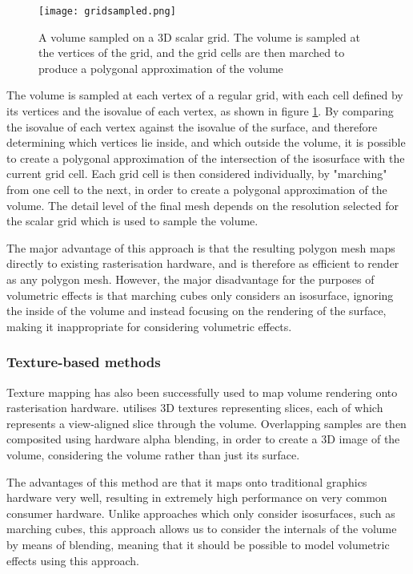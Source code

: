\begin{figure}
\centering
	\texttt{[image: gridsampled.png]}
	\caption{A volume sampled on a 3D scalar grid. The volume is sampled at the vertices of the grid, and the grid cells are then marched to produce a polygonal approximation of the volume}
	\label{fig:scalar_field_approximation}
\end{figure}

The volume is sampled at each vertex of a regular grid, with each cell defined by its vertices and the isovalue of each vertex, as shown in figure \ref{fig:scalar_field_approximation}. By comparing the isovalue of each vertex against the isovalue of the surface, and therefore determining which vertices lie inside, and which outside the volume, it is possible to create a polygonal approximation of the intersection of the isosurface with the current grid cell. Each grid cell is then considered individually, by "marching" from one cell to the next, in order to create a polygonal approximation of the volume. The detail level of the final mesh depends on the resolution selected for the scalar grid which is used to sample the volume.

The major advantage of this approach is that the resulting polygon mesh maps directly to existing rasterisation hardware, and is therefore as efficient to render as any polygon mesh. However, the major disadvantage for the purposes of volumetric effects is that marching cubes only considers an isosurface, ignoring the inside of the volume and instead focusing on the rendering of the surface, making it inappropriate for considering volumetric effects.

\subsubsection{Texture-based methods}
Texture mapping has also been successfully used to map volume rendering onto rasterisation hardware. \cite{engel02interactivehigh-quality} utilises 3D textures representing slices, each of which represents a view-aligned slice through the volume. Overlapping samples are then composited using hardware alpha blending, in order to create a 3D image of the volume, considering the volume rather than just its surface.

The advantages of this method are that it maps onto traditional graphics hardware very well, resulting in extremely high performance on very common consumer hardware. Unlike approaches which only consider isosurfaces, such as marching cubes, this approach allows us to consider the internals of the volume by means of blending, meaning that it should be possible to model volumetric effects using this approach.

